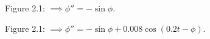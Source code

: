 \documentclass[hidelinks, 11pt]{article}
\begin{document}
\begin{center}
\begin{changemargin}{4.5cm}{4.5cm}  
  Figure 2.1: $\implies \phi'' = -\sin{\phi}$.
\end{changemargin}
\end{center}

\begin{center}
\begin{changemargin}{4.5cm}{4.5cm}  
  Figure 2.1: $\implies \phi'' = -\sin{\phi} + 0.008\cos{(0.2t - \phi)}$.
\end{changemargin}
\end{center}
\end{document}

